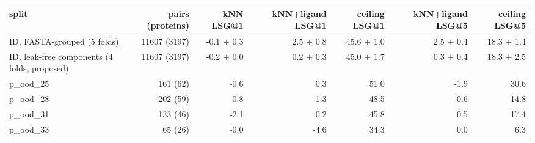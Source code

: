 \begin{tabular}{lrrrrrr}
\toprule
split & pairs (proteins) & kNN LSG@1 & kNN+ligand LSG@1 & ceiling LSG@1 & kNN+ligand LSG@5 & ceiling LSG@5 \\ \midrule
ID, FASTA-grouped (5 folds) & 11607 (3197) & -0.1 $\pm$ 0.3 & 2.5 $\pm$ 0.8 & 45.6 $\pm$ 1.0 & 2.5 $\pm$ 0.4 & 18.3 $\pm$ 1.4 \\
ID, leak-free components (4 folds, proposed) & 11607 (3197) & -0.2 $\pm$ 0.0 & 0.2 $\pm$ 0.3 & 45.0 $\pm$ 1.7 & 0.3 $\pm$ 0.4 & 18.3 $\pm$ 2.5 \\
p\_ood\_25 & 161 (62) & -0.6 & 0.3 & 51.0 & -1.9 & 30.6 \\
p\_ood\_28 & 202 (59) & -0.8 & 1.3 & 48.5 & -0.6 & 14.8 \\
p\_ood\_31 & 133 (46) & -2.1 & 0.2 & 45.8 & 0.5 & 17.4 \\
p\_ood\_33 & 65 (26) & -0.0 & -4.6 & 34.3 & 0.0 & 6.3 \\
\bottomrule
\end{tabular}
